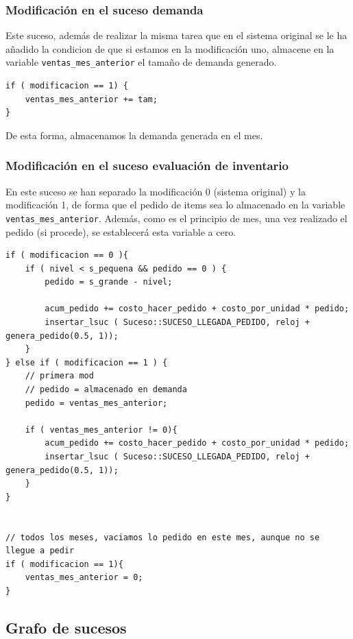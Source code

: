 \documentclass[12pt, spanish]{article}
\begin{document}
\subsubsection{Modificación en el suceso demanda}

Este suceso, además de realizar la misma tarea que en el sistema original se le ha añadido la condicion de que si estamos en la modificación uno, almacene en la variable \texttt{ventas\_mes\_anterior} el tamaño de demanda generado.

\begin{lstlisting}
if ( modificacion == 1) {
	ventas_mes_anterior += tam;
}
\end{lstlisting}

De esta forma, almacenamos la demanda generada en el mes.

\subsubsection{Modificación en el suceso evaluación de inventario}

En este suceso se han separado la modificación 0 (sistema original) y la modificación 1, de forma que el pedido de items sea lo almacenado en la variable \texttt{ventas\_mes\_anterior}. Además, como es el principio de mes, una vez realizado el pedido (si procede), se establecerá esta variable a cero.

\begin{lstlisting}
if ( modificacion == 0 ){
	if ( nivel < s_pequena && pedido == 0 ) {
		pedido = s_grande - nivel;

		acum_pedido += costo_hacer_pedido + costo_por_unidad * pedido;
		insertar_lsuc ( Suceso::SUCESO_LLEGADA_PEDIDO, reloj + genera_pedido(0.5, 1));
	}
} else if ( modificacion == 1 ) {
	// primera mod
	// pedido = almacenado en demanda
	pedido = ventas_mes_anterior;

	if ( ventas_mes_anterior != 0){
		acum_pedido += costo_hacer_pedido + costo_por_unidad * pedido;
		insertar_lsuc ( Suceso::SUCESO_LLEGADA_PEDIDO, reloj + genera_pedido(0.5, 1));
	}
}


// todos los meses, vaciamos lo pedido en este mes, aunque no se llegue a pedir
if ( modificacion == 1){
	ventas_mes_anterior = 0;
}
\end{lstlisting}

\newpage

\subsection{Grafo de sucesos}
\end{document}
